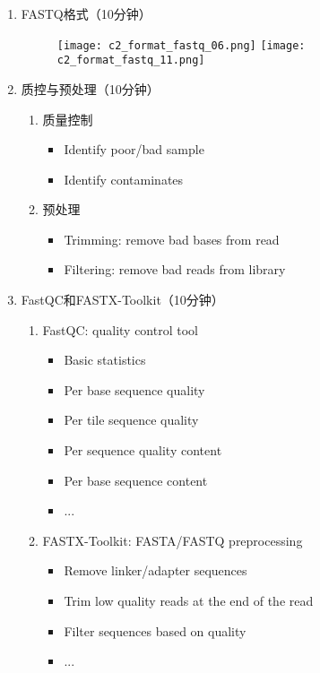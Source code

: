 \documentclass{TIJMUjiaoanSY}
\begin{document}
\noindent
\begin{enumerate}
  \item FASTQ格式（10分钟）
    \begin{figure}[ht]
      \centering
      \texttt{[image: c2\_format\_fastq\_06.png]}
      \texttt{[image: c2\_format\_fastq\_11.png]}
    \end{figure}

  \item 质控与预处理（10分钟）
    \begin{enumerate}
      \item 质量控制
        \begin{itemize}
          \item Identify poor/bad sample
          \item Identify contaminates
        \end{itemize}
      \item 预处理
        \begin{itemize}
          \item Trimming: remove bad bases from read
          \item Filtering: remove bad reads from library
        \end{itemize}
    \end{enumerate}

  \item FastQC和FASTX-Toolkit（10分钟）
    \begin{multicols}{2}
      \begin{enumerate}
        \item FastQC: quality control tool
          \begin{itemize}
            \item Basic statistics
            \item Per base sequence quality
            \item Per tile sequence quality
            \item Per sequence quality content
            \item Per base sequence content
            \item ...
         \end{itemize}
       \item FASTX-Toolkit: FASTA/FASTQ preprocessing
         \begin{itemize}
           \item Remove linker/adapter sequences
           \item Trim low quality reads at the end of the read
           \item Filter sequences based on quality
           \item ...
         \end{itemize}
      \end{enumerate}
    \end{multicols}


\end{enumerate}
\end{document}
